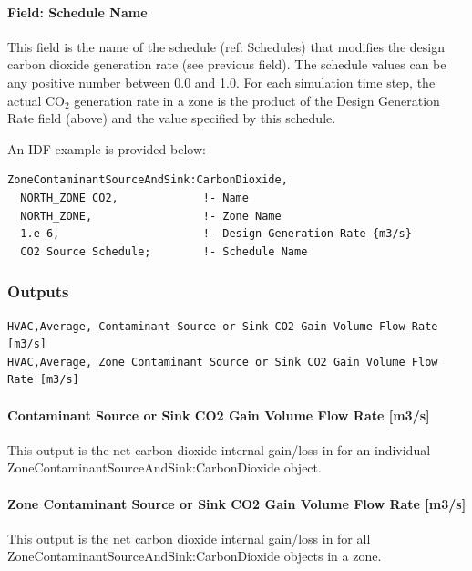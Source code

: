 \paragraph{Field: Schedule Name}\label{field-schedule-name-6-000}

This field is the name of the schedule (ref: Schedules) that modifies the design carbon dioxide generation rate (see previous field). The schedule values can be any positive number between 0.0 and 1.0. For each simulation time step, the actual CO\(_{2}\) generation rate in a zone is the product of the Design Generation Rate field (above) and the value specified by this schedule.

An IDF example is provided below:

\begin{lstlisting}
ZoneContaminantSourceAndSink:CarbonDioxide,
  NORTH_ZONE CO2,             !- Name
  NORTH_ZONE,                 !- Zone Name
  1.e-6,                      !- Design Generation Rate {m3/s}
  CO2 Source Schedule;        !- Schedule Name
\end{lstlisting}

\subsubsection{Outputs}\label{outputs-6-004}

\begin{lstlisting}
HVAC,Average, Contaminant Source or Sink CO2 Gain Volume Flow Rate [m3/s]
HVAC,Average, Zone Contaminant Source or Sink CO2 Gain Volume Flow Rate [m3/s]
\end{lstlisting}

\paragraph{Contaminant Source or Sink CO2 Gain Volume Flow Rate {[}m3/s{]}}\label{contaminant-source-or-sink-co2-gain-volume-flow-rate-m3s}

This output is the net carbon dioxide internal gain/loss in \si{\volumeFlowRate} for an individual ZoneContaminantSourceAndSink:CarbonDioxide object.

\paragraph{Zone Contaminant Source or Sink CO2 Gain Volume Flow Rate {[}m3/s{]}}\label{zone-contaminant-source-or-sink-co2-gain-volume-flow-rate-m3s}

This output is the net carbon dioxide internal gain/loss in \si{\volumeFlowRate} for all ZoneContaminantSourceAndSink:CarbonDioxide objects in a zone.

